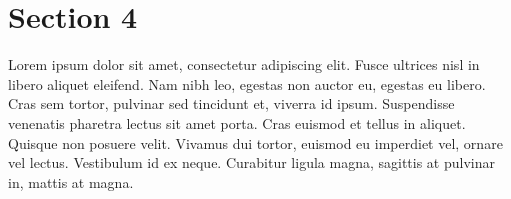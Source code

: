 \documentclass[a4paper, 12pt]{article}
\begin{document}

\section{Section 4}
\label{section-4}

Lorem ipsum dolor sit amet, consectetur adipiscing elit. Fusce ultrices nisl in libero aliquet eleifend. Nam nibh leo, egestas non auctor eu, egestas eu libero. Cras sem tortor, pulvinar sed tincidunt et, viverra id ipsum. Suspendisse venenatis pharetra lectus sit amet porta. Cras euismod et tellus in aliquet. Quisque non posuere velit. Vivamus dui tortor, euismod eu imperdiet vel, ornare vel lectus. Vestibulum id ex neque. Curabitur ligula magna, sagittis at pulvinar in, mattis at magna.






\nocite{*}
\end{document}
